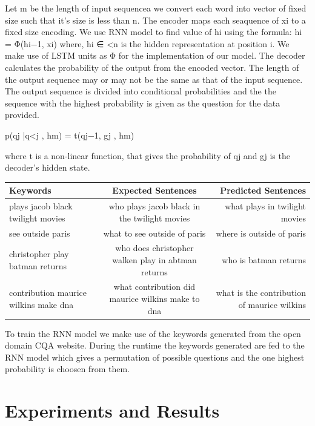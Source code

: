 \documentclass[conference]{IEEEtran}
\begin{document}
Let m be the length of input sequencea we convert each word into vector of fixed size such that it's size is less than n. The encoder maps each seaquence of xi to a fixed size encoding. We use RNN model to find value of hi using the formula:
        hi = Φ(hi−1, xi)
where, hi ∈ <n is the hidden representation at position i. 
We make use of LSTM units as Φ for the implementation of our model. The decoder calculates the probability of the output from the encoded vector. The length of the output sequence may or may not be the same as that of the input sequence. 
The output sequence is divided into conditional probabilities and the the sequence with the highest probability is given as the question for the data provided.
\centerline{p(qj |q<j , hm) = t(qj−1, gj , hm)} 
where t is a non-linear function, that gives the probability of qj and gj is the decoder's hidden state.
\begin{table}[t]

\begin{tabular}{|l|c|r|}
	\hline
	Keywords & Expected Sentences & Predicted Sentences\\
	\hline
    plays jacob black twilight movies & who plays jacob black in the twilight movies & what plays in twilight movies\\
	\hline
    see outside paris & what to see outside of paris & where is outside of paris\\
    \hline
    christopher play batman returns & who does christopher walken play in abtman returns & who is batman returns\\
    \hline
    contribution maurice wilkins make dna & what contribution did maurice wilkins make to dna & what is the contribution of maurice wilkins\\
    
	\hline
\end{tabular}
\end{table}
To train the RNN model we make use of the keywords generated from the open domain CQA website. During the runtime the keywords generated are fed to the RNN model which gives a permutation of possible questions and the one highest probability is choosen from them.

\section{Experiments and Results}
\end{document}
